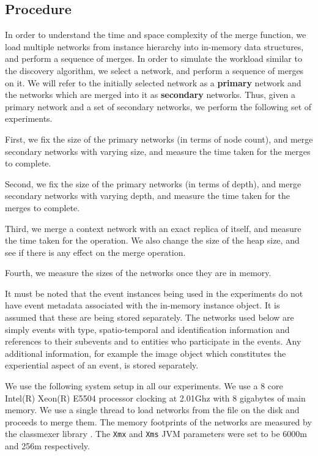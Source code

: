 \subsection{Procedure}
In order to understand the time and space complexity of the merge function, we load multiple networks from instance hierarchy into in-memory data structures, and perform a sequence of merges. In order to simulate the workload similar to the discovery algorithm, we select a network, and perform a sequence of merges on it. We will refer to the initially selected network as a \textbf{primary} network and the networks which are merged into it as \textbf{secondary} networks. Thus, given a primary network and a set of secondary networks, we perform the following set of experiments.

First, we fix the size of the primary networks (in terms of node count), and merge secondary networks with varying size, and measure the time taken for the merges to complete.

Second, we fix the size of the primary networks (in terms of depth), and merge secondary networks with varying depth, and measure the time taken for the merges to complete.

Third, we merge a context network with an exact replica of itself, and measure the time taken for the operation. We also change the size of the heap size, and see if there is any effect on the merge operation.

Fourth, we measure the sizes of the networks once they are in memory.

It must be noted that the event instances being used in the experiments do not have event metadata associated with the in-memory instance object. It is assumed that these are being stored separately. The networks used below are simply events with type, spatio-temporal and identification information and references to their subevents and to entities who participate in the events. Any additional information, for example the image object which constitutes the experiential aspect of an event, is stored separately.

We use the following system setup in all our experiments. We use a 8 core Intel(R) Xeon(R) E5504 processor clocking at 2.01Ghz with 8 gigabytes of main memory. We use a single thread to load networks from the file on the disk and proceeds to merge them. The memory footprints of the networks are measured by the classmexer library \cite{classmexer}. The \texttt{Xmx} and \texttt{Xms} JVM parameters were set to be 6000m and 256m respectively.

